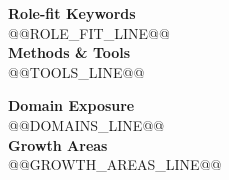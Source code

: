 \documentclass[9pt,a4paper]{article}
\begin{document}
\vspace{1.0em}

\noindent
\begin{minipage}[t]{0.48\textwidth}
\vspace{0pt}
\textbf{Role-fit Keywords}\\[0.18em]
@@ROLE_FIT_LINE@@\\[0.65em]
\textbf{Methods \& Tools}\\[0.18em]
@@TOOLS_LINE@@
\end{minipage}
\hfill
\begin{minipage}[t]{0.48\textwidth}
\vspace{0pt}
\textbf{Domain Exposure}\\[0.18em]
@@DOMAINS_LINE@@\\[0.65em]
\textbf{Growth Areas}\\[0.18em]
@@GROWTH_AREAS_LINE@@
\end{minipage}
\end{document}
